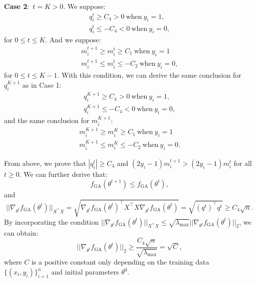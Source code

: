 \documentclass{article}
\theoremstyle{plain}
\theoremstyle{definition}
\theoremstyle{remark}
\begin{document}
\textbf{Case 2}:~$t=K>0$. We suppose:
\begin{equation}
\begin{aligned}
    q_i^t\geq C_4>0~\text{when}~y_i=1,\\
    q_i^t\leq -C_4<0~\text{when}~y_i=0,
\end{aligned}
\end{equation}
for $0\leq t\leq K$. And we suppose:
\begin{equation}
\begin{aligned}
    m_i^{t+1}\geq m_i^t\geq C_1~\text{when}~y_i=1\\
    m_i^{t+1}\leq m_i^t\leq -C_2~\text{when}~y_i=0,
\end{aligned}
\end{equation}
for $0\leq t\leq K-1$. With this condition, we can derive the same conclusion for $q_i^{K+1}$ as in Case 1:
\begin{equation}
\begin{aligned}
    q_i^{K+1}\geq C_4>0~\text{when}~y_i=1,\\
    q_i^{K+1}\leq -C_4<0~\text{when}~y_i=0,
\end{aligned}
\end{equation}
and the same conclusion for $m_i^{K+1}$:
\begin{equation}
\begin{aligned}
    m_i^{K+1}\geq m_i^K\geq C_1~\text{when}~y_i=1\\
    m_i^{K+1}\leq m_i^K\leq -C_2~\text{when}~y_i=0.
\end{aligned}
\end{equation}

From above, we prove that $|q_i^t|\geq C_4$ and $(2y_i-1)m_i^{t+1}>(2y_i-1)m_i^{t}$ for all $t\geq0$. We can further derive that:
\begin{equation}
    f_{\text{GA}}(\theta^{t+1})\leq f_{\text{GA}}(\theta^{t}),
\end{equation}
and
\begin{equation}
    ||\nabla_{\theta^t} f_{\text{GA}}(\theta^t)||_{X^\top X}=\sqrt{\nabla_{\theta^t} f_{\text{GA}}(\theta^t)^\top X^\top X \nabla_{\theta^t} f_{\text{GA}}(\theta^t)}=\sqrt{(q^t)^\top q^t}\geq C_4\sqrt{n}.
\end{equation}
By incorporating the condition $||\nabla_{\theta^t} f_{\text{GA}}(\theta^t)||_{X^\top X}\leq\sqrt{\lambda_{\text{max}}}||\nabla_{\theta^t} f_{\text{GA}}(\theta^t)||_2$, we can obtain:
\begin{equation}
    ||\nabla_{\theta^t} f_{\text{GA}}(\theta^t)||_2\geq \frac{C_4\sqrt{n}}{\sqrt{\lambda_{\text{max}}}}=\sqrt{C},
\end{equation}
where $C$ is a positive constant only depending on the training data $\{(x_i, y_i)\}_{i=1}^n$ and initial parameters $\theta^0$.
\end{document}
